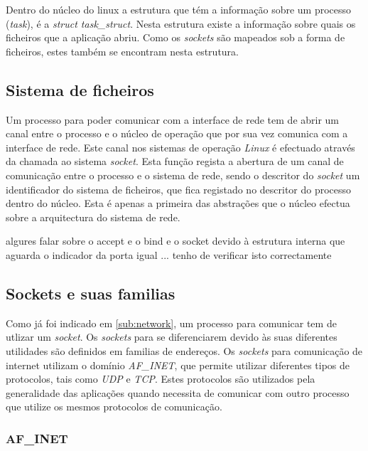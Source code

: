 Dentro do núcleo do linux a estrutura que tém a informação sobre um processo (\textit{task}), é a \textit{struct task\_struct}. 
 Nesta estrutura existe a informação sobre quais os ficheiros que a aplicação abriu.
 Como os \textit{sockets} são mapeados sob a forma de ficheiros, estes também se encontram nesta estrutura.

\subsection{Sistema de ficheiros}

Um processo para poder comunicar com a interface de rede tem de abrir um canal entre o processo e o núcleo de operação que por sua vez comunica com a interface de rede.
 Este canal nos sistemas de operação \textit{Linux} é efectuado através da chamada ao sistema \textit{socket}.
 Esta função regista a abertura de um canal de comunicação entre o processo e o sistema de rede, sendo o descritor do \textit{socket} um identificador do sistema de ficheiros, que fica registado no descritor do processo dentro do núcleo.
 Esta é apenas a primeira das abstrações que o núcleo efectua sobre a arquitectura do sistema de rede.
  
algures falar sobre o accept e o bind e o socket devido à estrutura interna que aguarda o indicador da porta igual ... tenho de verificar isto correctamente


\subsection{Sockets e suas familias}
\label{sub:af_inet}

Como já foi indicado em \ref{sub:network}, um processo para comunicar tem de utlizar um \textit{socket}.
 Os \textit{sockets} para se diferenciarem devido às suas diferentes utilidades são definidos em  familias de endereços.
 Os \textit{sockets} para comunicação de internet utilizam o domínio \textit{AF\_INET}, que permite utilizar diferentes tipos de protocolos, tais como \textit{UDP} e \textit{TCP}.
 Estes protocolos são utilizados pela generalidade das aplicações quando necessita de comunicar com outro processo que utilize os mesmos protocolos de comunicação.


\subsubsection{AF\_INET}

